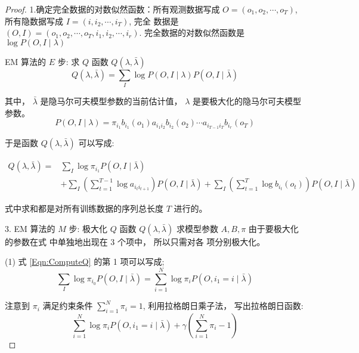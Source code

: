 \begin{proof}
    1.确定完全数据的对数似然函数：所有观测数据写成 $ O=\left(o_{1}, o_{2}, \cdots, o_{T}\right) $, 所有隐数据写成 $ I=\left(i, i_{2}, \cdots, i_{T}\right) $, 完全 数据是 $ (O, I)=\left(o_{1}, o_{2}, \cdots, o_{T}, i_{1}, i_{2}, \cdots, i_{r}\right) . $ 完全数据的对数似然函数是 $ \log P(O, I \mid \lambda) $


EM 算法的 $ {E} $ 步: 求 $ Q $ 函数 $ Q(\lambda, \bar{\lambda}) $
\begin{equation}
Q(\lambda, \bar{\lambda})=\sum_{I} \log P(O, I \mid \lambda) P(O, I \mid \bar{\lambda})
\end{equation}

其中， $ \bar{\lambda} $ 是隐马尔可夫模型参数的当前估计值， $ \lambda $ 是要极大化的隐马尔可夫模型参数。
\begin{equation} P(O, I \mid \lambda)=\pi_{i_{1}} b_{i_{1}}\left(o_{1}\right) a_{i_1 i_{2}} b_{i_{2}}\left(o_{2}\right) \cdots a_{i_{T-1} i_{T}} b_{i_{r}}\left(o_{T}\right) \end{equation}

于是函数 $ Q(\lambda, \bar{\lambda}) $ 可以写成:

\begin{equation}
    \label{Eqn:ComputeQ}
\begin{aligned}
Q(\lambda, \bar{\lambda})=& \sum_{I} \log \pi_{i_1} P(O, I \mid \bar{\lambda}) \\
&+\sum_{I}\left(\sum_{t=1}^{T-1} \log a_{i_t i_{t+1}}\right) P(O, I \mid \bar{\lambda})+\sum_{I}\left(\sum_{t=1}^{T} \log b_{i_{t}}\left(o_{t}\right)\right) P(O, I \mid \bar{\lambda})
\end{aligned}
\end{equation}


式中求和都是对所有训练数据的序列总长度 $ T $ 进行的。


3. EM 算法的 $ {M} $ 步: 极大化 $ Q $ 函数 $ Q(\lambda, \bar{\lambda}) $ 求模型参数 $ A, B, \pi $ 由于要极大化的参数在式 中单独地出现在 3 个项中， 所以只需对各 项分别极大化。

(1) 式 \ref{Eqn:ComputeQ} 的第 1 项可以写成;
\begin{equation}
\sum_{I} \log \pi_{i_{0}} P(O, I \mid \bar{\lambda})=\sum_{i=1}^{N} \log \pi_{i} P\left(O, i_{1}=i \mid \bar{\lambda}\right)
\end{equation}

注意到 $ \pi_{i} $ 满足约束条件 $ \sum_{i=1}^{N} \pi_{i}=1 $, 利用拉格朗日乘子法， 写出拉格朗日函数:
\begin{equation}
\sum_{i=1}^{N} \log \pi_{i} P\left(O, i_{1}=i \mid \bar{\lambda}\right)+\gamma\left(\sum_{i=1}^{N} \pi_{i}-1\right)
\end{equation}


\end{proof}
